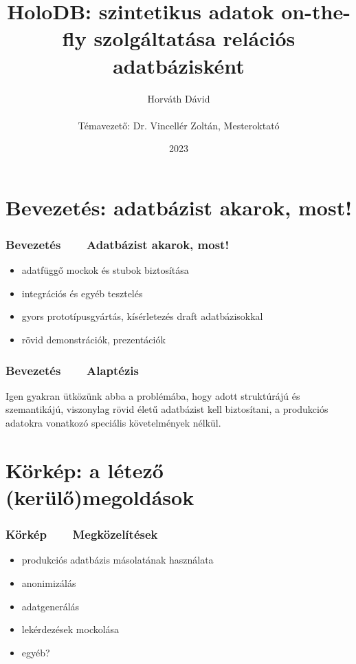 \documentclass[
]{beamer}
\title[HoloDB]{HoloDB: szintetikus adatok on-the-fly szolgáltatása relációs adatbázisként}
\author[Horváth Dávid]{Horváth Dávid \\ ~ \\ { \footnotesize Témavezető: Dr. Vincellér Zoltán, Mesteroktató }}
\institute[ELTE-IK]{ELTE Informatikai Kar, Információs Rendszerek Tanszék}
\date{2023}
\newcommand{\slidetitle}[2]{\frametitle{{\small #1 ~ \ding{226} ~ } \normalsize \textbf{#2} }}
\begin{document}
\beamertemplatenavigationsymbolsempty

\frame{\titlepage}


\section{Bevezetés: adatbázist akarok, most!}
\def\sectionshorttitle{Bevezetés}

\begin{frame}
    \slidetitle{\sectionshorttitle}{Adatbázist akarok, most!}
    
    \begin{itemize}
        \setlength\itemsep{1.5em}
        \item adatfüggő mockok és stubok biztosítása \pause
        \item integrációs és egyéb tesztelés \pause
        \item gyors prototípusgyártás, kísérletezés draft adatbázisokkal \pause
        \item rövid demonstrációk, prezentációk
    \end{itemize}
\end{frame}

\begin{frame}
    \slidetitle{\sectionshorttitle}{Alaptézis}
    
    \centering
    
    \begin{minipage}[b]{0.8\textwidth}
        \justifying
        Igen gyakran ütközünk abba a problémába,
        hogy adott struktúrájú és szemantikájú,
        viszonylag rövid életű adatbázist kell biztosítani,
        a produkciós adatokra vonatkozó speciális követelmények nélkül.
    \end{minipage}
\end{frame}

\section{Körkép: a létező (kerülő)megoldások}
\def\sectionshorttitle{Körkép}

\begin{frame}
    \slidetitle{\sectionshorttitle}{Megközelítések}
    
    \begin{itemize}
        \setlength\itemsep{0.5em}
        \item produkciós adatbázis másolatának használata \pause
        \item anonimizálás \pause
        \item adatgenerálás \pause
        \item lekérdezések mockolása \pause
        \item egyéb?
    \end{itemize}
\end{frame}
\end{document}
